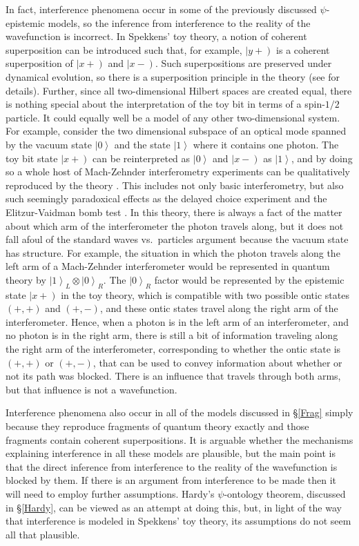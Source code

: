 \documentclass[DIV=calc,fontsize=12pt]{scrartcl} %
\theoremstyle{definition}
\theoremstyle{plain}
\newcommand{\RKet}[1]{\ensuremath{\left \vert #1 \right )}}
\newcommand{\Ket}[1]{\ensuremath{\left \vert #1 \right \rangle}}
\begin{document}
In fact, interference phenomena occur in some of the previously
discussed $\psi$-epistemic models, so the inference from interference
to the reality of the wavefunction is incorrect.  In Spekkens' toy
theory, a notion of coherent superposition can be introduced such
that, for example, $\RKet{y+}$ is a coherent superposition of
$\RKet{x+}$ and $\RKet{x-}$.  Such superpositions are preserved under
dynamical evolution, so there is a superposition principle in the
theory (see \cite{Spekkens2007} for details).  Further, since all
two-dimensional Hilbert spaces are created equal, there is nothing
special about the interpretation of the toy bit in terms of a
spin-$1/2$ particle.  It could equally well be a model of any other
two-dimensional system.  For example, consider the two dimensional
subspace of an optical mode spanned by the vacuum state $\Ket{0}$ and
the state $\Ket{1}$ where it contains one photon.  The toy bit state
$\RKet{x+}$ can be reinterpreted as $\Ket{0}$ and $\RKet{x-}$ as
$\Ket{1}$, and by doing so a whole host of Mach-Zehnder interferometry
experiments can be qualitatively reproduced by the theory
\cite{Martin2014}.  This includes not only basic interferometry, but
also such seemingly paradoxical effects as the delayed choice
experiment \cite{Wheeler1978} and the Elitzur-Vaidman bomb test
\cite{Elitzur1993}.  In this theory, there is always a fact of the
matter about which arm of the interferometer the photon travels along,
but it does not fall afoul of the standard waves vs.\ particles
argument because the vacuum state has structure.  For example, the
situation in which the photon travels along the left arm of a
Mach-Zehnder interferometer would be represented in quantum theory by
$\Ket{1}_L \otimes \Ket{0}_R$.  The $\Ket{0}_R$ factor would be
represented by the epistemic state $\RKet{x+}$ in the toy theory,
which is compatible with two possible ontic states $(+,+)$ and
$(+,-)$, and these ontic states travel along the right arm of the
interferometer.  Hence, when a photon is in the left arm of an
interferometer, and no photon is in the right arm, there is still a
bit of information traveling along the right arm of the
interferometer, corresponding to whether the ontic state is $(+,+)$ or
$(+,-)$, that can be used to convey information about whether or not
its path was blocked.  There is an influence that travels through both
arms, but that influence is not a wavefunction.

Interference phenomena also occur in all of the models discussed in
\S\ref{Frag} simply because they reproduce fragments of quantum theory
exactly and those fragments contain coherent superpositions.  It is
arguable whether the mechanisms explaining interference in all these
models are plausible, but the main point is that the direct inference
from interference to the reality of the wavefunction is blocked by
them.  If there is an argument from interference to be made then it
will need to employ further assumptions.  Hardy's $\psi$-ontology
theorem, discussed in \S\ref{Hardy}, can be viewed as an attempt at
doing this, but, in light of the way that interference is modeled in
Spekkens' toy theory, its assumptions do not seem all that plausible.
\end{document}
